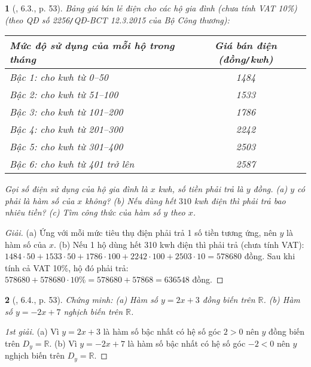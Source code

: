 \documentclass{article}
\newtheorem{baitoan}{}
\begin{document}
\begin{baitoan}[\cite{Binh_boi_duong_Toan_9_tap_1}, 6.3., p. 53]
	Bảng giá bán lẻ điện cho các hộ gia đình (chưa tính {\rm VAT 10\%}) (theo QĐ số 2256{\tt/}QĐ-BCT 12.3.2015 của Bộ Công thương):
	\begin{table}[H]
		\centering
		\begin{tabular}{|l|c|}
			\hline
			Mức độ sử dụng của mỗi hộ trong tháng & Giá bán điện (đồng{\tt/}kwh) \\
			\hline
			Bậc 1: cho kwh từ 0--50 & 1484 \\
			\hline
			Bậc 2: cho kwh từ 51--100 & 1533 \\
			\hline
			Bậc 3: cho kwh từ 101--200 & 1786 \\
			\hline
			Bậc 4: cho kwh từ 201--300 & 2242 \\
			\hline
			Bậc 5: cho kwh từ 301--400 & 2503 \\
			\hline
			Bậc 6: cho kwh từ 401 trở lên & 2587 \\
			\hline
		\end{tabular}
	\end{table}
	\noindent Gọi số điện sử dụng của hộ gia đình là $x$ {\rm kwh}, số tiền phải trả là $y$ đồng. (a) $y$ có phải là hàm số của $x$ không? (b) Nếu dùng hết $310$ {\rm kwh} điện thì phải trả bao nhiêu tiền? (c) Tìm công thức của hàm số $y$ theo $x$.
\end{baitoan}

\begin{proof}[Giải]
	(a) Ứng với mỗi mức tiêu thụ điện phải trả 1 số tiền tương ứng, nên $y$ là hàm số của $x$. (b) Nếu 1 hộ dùng hết 310 kwh điện thì phải trả (chưa tính VAT): $1484\cdot50 + 1533\cdot50 + 1786\cdot100 + 2242\cdot100 + 2503\cdot10 = 578680$ đồng. Sau khi tính cả VAT 10\%, hộ đó phải trả: $578680 + 578680\cdot10\% = 578680 + 57868 = 636548$ đồng.
\end{proof}

\begin{baitoan}[\cite{Binh_boi_duong_Toan_9_tap_1}, 6.4., p. 53]
	Chứng minh: (a) Hàm số $y = 2x + 3$ đồng biến trên $\mathbb{R}$. (b) Hàm số $y = -2x + 7$ nghịch biến trên $\mathbb{R}$.
\end{baitoan}

\begin{proof}[1st giải]
	(a) Vì $y = 2x + 3$ là hàm số bậc nhất có hệ số góc $2 > 0$ nên $y$ đồng biến trên $D_y = \mathbb{R}$. (b) Vì $y = -2x + 7$ là hàm số bậc nhất có hệ số góc $-2 < 0$ nên $y$ nghịch biến trên $D_y = \mathbb{R}$.
\end{proof}
\end{document}
